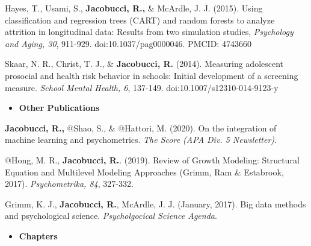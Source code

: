 \documentclass[letterpaper,10pt]{article}
\begin{document}
\begin{etaremune}
	\item Hayes, T., Usami, S., \textbf{Jacobucci, R.,} \& McArdle, J. J. (2015). Using classification and regression trees (CART) and random forests to analyze attrition in longitudinal data: Results from two simulation studies, \emph{Psychology and Aging, 30}, 911-929. doi:10.1037/pag0000046. PMCID: 4743660
	\item Skaar, N. R., Christ, T. J., \& \textbf{Jacobucci, R.} (2014). Measuring adolescent prosocial and health risk behavior in schools: Initial development of a screening measure. \emph{School Mental Health, 6}, 137-149. doi:10.1007/s12310-014-9123-y
	
\end{etaremune}
%
\vspace{3mm}
\begin{itemize}
	\item {\textbf{\large{Other Publications}}}
\end{itemize}
\begin{etaremune}
	\item  \textbf{Jacobucci, R.,} $@$Shao, S., \& $@$Hattori, M. (2020). On the integration of machine learning and psychometrics. \emph{The Score (APA Div. 5 Newsletter)}.
	\item  $@$Hong, M. R., \textbf{Jacobucci, R.}. (2019). Review of Growth Modeling: Structural Equation and Multilevel Modeling Approaches (Grimm, Ram \& Estabrook, 2017). \emph{Psychometrika, 84}, 327-332.
	\item Grimm, K. J., \textbf{Jacobucci, R.}, McArdle, J. J. (January, 2017). Big data methods and psychological science. \emph{Psycholgocical Science Agenda}.
	
\end{etaremune}
\vspace{3mm}
%
%
\begin{itemize}
	\item {\textbf{\large{Chapters}}}
\end{itemize}
\end{document}
